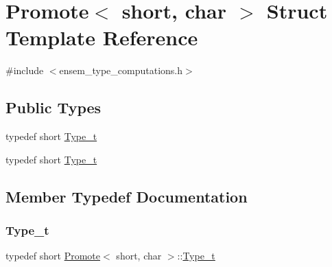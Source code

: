 \hypertarget{structPromote_3_01short_00_01char_01_4}{}\section{Promote$<$ short, char $>$ Struct Template Reference}
\label{structPromote_3_01short_00_01char_01_4}


{\ttfamily \#include $<$ensem\+\_\+type\+\_\+computations.\+h$>$}

\subsection*{Public Types}
\begin{DoxyCompactItemize}
\item 
typedef short \mbox{\hyperlink{structPromote_3_01short_00_01char_01_4_ad7373b6a3ec65f1b36fa8c03e0f390f6}{Type\+\_\+t}}
\item 
typedef short \mbox{\hyperlink{structPromote_3_01short_00_01char_01_4_ad7373b6a3ec65f1b36fa8c03e0f390f6}{Type\+\_\+t}}
\end{DoxyCompactItemize}


\subsection{Member Typedef Documentation}
\mbox{\label{structPromote_3_01short_00_01char_01_4_ad7373b6a3ec65f1b36fa8c03e0f390f6}} 
\subsubsection{\texorpdfstring{Type\_t}{Type\_t}\hspace{0.1cm}{\footnotesize\ttfamily [1/2]}}
{\footnotesize\ttfamily typedef short \mbox{\hyperlink{structPromote}{Promote}}$<$ short, char $>$\+::\mbox{\hyperlink{structPromote_3_01short_00_01char_01_4_ad7373b6a3ec65f1b36fa8c03e0f390f6}{Type\+\_\+t}}}

\mbox{\label{structPromote_3_01short_00_01char_01_4_ad7373b6a3ec65f1b36fa8c03e0f390f6}} 
